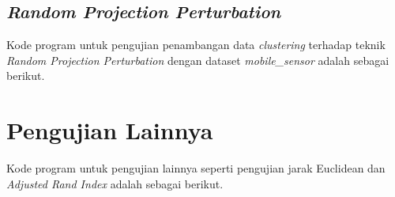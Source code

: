 \subsection{\textit{Random Projection Perturbation}}
\label{subsec:kmeans-projection-perturbation}
Kode program untuk pengujian penambangan data \textit{clustering} terhadap teknik \textit{Random Projection Perturbation} dengan dataset \textit{mobile\_sensor} adalah sebagai berikut.


\section{Pengujian Lainnya}
\label{sec:pengujian-lainnya}

Kode program untuk pengujian lainnya seperti pengujian jarak Euclidean dan \textit{Adjusted Rand Index} adalah sebagai berikut.

